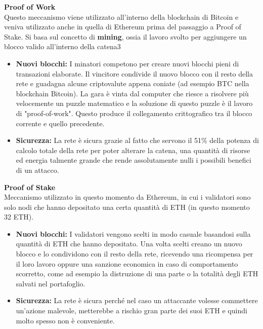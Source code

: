 \textbf{Proof of Work} \\
Questo meccanismo viene utilizzato all'interno della blockchain di Bitcoin e
veniva utilizzato anche in quella di Ethereum prima del passaggio a Proof of
Stake. Si basa sul concetto di \textbf{mining}, ossia il lavoro svolto per
aggiungere un blocco valido all'interno della catena3 
\begin{itemize}
    \item \textbf{Nuovi blocchi:} I minatori competono per creare nuovi
        blocchi pieni di transazioni elaborate. Il vincitore condivide il nuovo
        blocco con il resto della rete e guadagna alcune criptovalute appena
        coniate (ad esempio BTC nella blockchain Bitcoin). La gara è vinta dal
        computer che riesce a risolvere più velocemente un puzzle matematico e
        la soluzione di questo puzzle è il lavoro di "proof-of-work". Questo
        produce il collegamento crittografico tra il blocco corrente e quello
        precedente. 
    \item \textbf{Sicurezza:} La rete è sicura grazie al fatto che servono il
        51\% della potenza di calcolo totale della rete per poter alterare la
        catena, una quantità di risorse ed energia talmente grande che rende
        assolutamente nulli i possibili benefici di un attacco.
\end{itemize}

\textbf{Proof of Stake} \\
Meccanismo utilizzato in questo momento da Ethereum, in cui i validatori sono
solo nodi che hanno depositato una certa quantità di ETH (in questo momento 32
ETH). 
\begin{itemize}
    \item \textbf{Nuovi blocchi:} I validatori vengono scelti in modo casuale
        basandosi sulla quantità di ETH che hanno depositato. Una volta scelti
        creano un nuovo blocco e lo condividono con il resto della rete,
        ricevendo una ricompensa per il loro lavoro oppure una sanzione
        economica in caso di comportamento scorretto, come ad esempio la
        distruzione di una parte o la totalità degli ETH salvati nel
        portafoglio.
    \item \textbf{Sicurezza:} La rete è sicura perché nel caso un attaccante
        volesse commettere un'azione malevole, metterebbe a rischio gran parte
        dei suoi ETH e quindi molto spesso non è conveniente.
\end{itemize}


